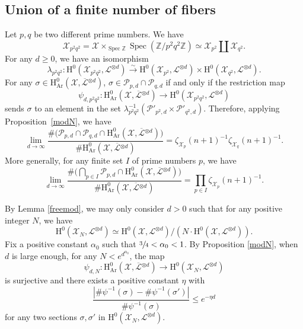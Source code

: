 \documentclass[11pt]{article}
\numberwithin{equation}{section}
\theoremstyle{plain}
\theoremstyle{definition}
\newcommand{\ho}{\mathrm{H}}
\newcommand{\X}{\mathcal{X}}
\newcommand{\Li}{\overline{\mathcal{L}}{}}
\newcommand{\li}{\mathcal{L}}
\newcommand{\Z}{\mathbb{Z}}
\DeclareMathOperator{\Spec}{Spec}
\begin{document}
\subsection{Union of a finite number of fibers}

Let $p,q$ be two different prime numbers. We have
\[
\X_{p^2q^2} =\X\times_{\Spec \Z}\Spec(\Z/p^2q^2\Z)\simeq \X_{p^2}\amalg \X_{q^2}.
\]
For any $d\geq 0$, we have an isomorphism
\[
\lambda_{p^2q^2}: \ho^0(\X_{p^2q^2},\li^{\otimes d}) \stackrel{\sim}\to \ho^0(\X_{p^2},\li^{\otimes d}) \times \ho^0(\X_{q^2},\li^{\otimes d}).
\]
For any $\sigma \in \ho^0_{\mathrm{Ar}}(\X, \overline{\mathcal{L}}{}^{\otimes d})$, $\sigma\in \mathcal{P}_{p,d}\cap \mathcal{P}_{q,d}$ if and only if the restriction map
\[
\psi_{d,p^2q^2}: \ho^0_{\mathrm{Ar}}(\X,\Li^{\otimes d}) \to \ho^0(\X_{p^2q^2},\li^{\otimes d})
\]
sends $\sigma$ to an element in the set $\lambda^{-1}_{p^2q^2}(\mathcal{P}'_{p^2,d}\times \mathcal{P}'_{q^2,d})$. Therefore, applying Proposition~\ref{modN}, we have
\[
\lim_{d\to \infty}\frac{\#\bigl(\mathcal{P}_{p,d}\cap \mathcal{P}_{q,d}\cap \ho^0_{\mathrm{Ar}}(\X, \overline{\mathcal{L}}{}^{\otimes d})\bigr)}{\#\ho^0_{\mathrm{Ar}}(\X, \overline{\mathcal{L}}{}^{\otimes d})}=\zeta_{\X_p}(n+1)^{-1}\zeta_{\X_q}(n+1)^{-1}.
\]
More generally, for any finite set $I$ of prime numbers $p$, we have
\[
\lim_{d\to \infty}\frac{\#\bigl(\bigcap_{p\in I}\mathcal{P}_{p,d}\cap \ho^0_{\mathrm{Ar}}(\X, \overline{\mathcal{L}}{}^{\otimes d})\bigr)}{\#\ho^0_{\mathrm{Ar}}(\X, \overline{\mathcal{L}}{}^{\otimes d})}=\prod_{p\in I}\zeta_{\X_p}(n+1)^{-1}.
\]

By Lemma \ref{freemod}, we may only consider $d>0$ such that for any positive integer $N$, we have
\[
\ho^0(\X_N, \li^{\otimes d})\simeq \ho^0(\X, \li^{\otimes d})/(N\cdot\ho^0(\X, \li^{\otimes d})).
\]
Fix a positive constant $\alpha_0$ such that $\sfrac{3}{4}<\alpha_0<1$. By Proposition \ref{modN}, when $d$ is large enough, for any $N<e^{d^{\alpha_0}}$, the map
\[
\psi_{d,N}: \ho^0_{\mathrm{Ar}}(\X,\Li^{\otimes d}) \to \ho^0(\X_N,\li^{\otimes d})
\]
is surjective and there exists a positive constant $\eta$ with
\[
\frac{| \#\psi^{-1}(\sigma)- \#\psi^{-1}(\sigma') |}{\#\psi^{-1}(\sigma)}\leq e^{-\eta d}
\]
for any two sections $\sigma,\sigma'$ in $ \ho^0(\X_N,\li^{\otimes d})$.
\end{document}
